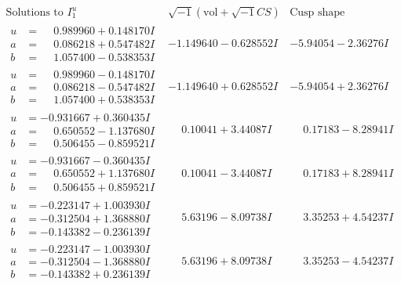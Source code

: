 \documentclass[1p]{elsarticle_modified}
\theoremstyle{definition}
\newcommand{\I}{\sqrt{-1}}
\begin{document}
$$\begin{array}{c|c|c}  
\text{Solutions to }I^u_{1}& \I (\text{vol} + \sqrt{-1}CS) & \text{Cusp shape}\\
 \hline 
\begin{aligned}
u &= \phantom{-}0.989960 + 0.148170 I \\
a &= \phantom{-}0.086218 + 0.547482 I \\
b &= \phantom{-}1.057400 - 0.538353 I\end{aligned}
 & -1.149640 - 0.628552 I & -5.94054 - 2.36276 I \\ \hline\begin{aligned}
u &= \phantom{-}0.989960 - 0.148170 I \\
a &= \phantom{-}0.086218 - 0.547482 I \\
b &= \phantom{-}1.057400 + 0.538353 I\end{aligned}
 & -1.149640 + 0.628552 I & -5.94054 + 2.36276 I \\ \hline\begin{aligned}
u &= -0.931667 + 0.360435 I \\
a &= \phantom{-}0.650552 - 1.137680 I \\
b &= \phantom{-}0.506455 - 0.859521 I\end{aligned}
 & \phantom{-}0.10041 + 3.44087 I & \phantom{-}0.17183 - 8.28941 I \\ \hline\begin{aligned}
u &= -0.931667 - 0.360435 I \\
a &= \phantom{-}0.650552 + 1.137680 I \\
b &= \phantom{-}0.506455 + 0.859521 I\end{aligned}
 & \phantom{-}0.10041 - 3.44087 I & \phantom{-}0.17183 + 8.28941 I \\ \hline\begin{aligned}
u &= -0.223147 + 1.003930 I \\
a &= -0.312504 + 1.368880 I \\
b &= -0.143382 - 0.236139 I\end{aligned}
 & \phantom{-}5.63196 - 8.09738 I & \phantom{-}3.35253 + 4.54237 I \\ \hline\begin{aligned}
u &= -0.223147 - 1.003930 I \\
a &= -0.312504 - 1.368880 I \\
b &= -0.143382 + 0.236139 I\end{aligned}
 & \phantom{-}5.63196 + 8.09738 I & \phantom{-}3.35253 - 4.54237 I \\ \hline\begin{aligned}

\end{aligned}
\end{array}$$
\end{document}
